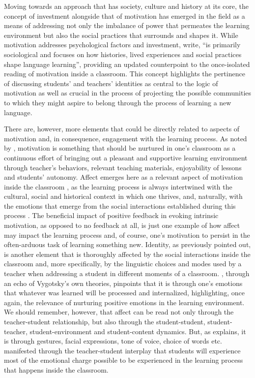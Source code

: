 \documentclass[english]{textolivre}
\begin{document}
Moving towards an approach that has society, culture and history at its core, the concept of investment \cite{norton2011identity} alongside that of motivation has emerged in the field as a means of addressing not only the imbalance of power that permeates the learning environment but also the social practices that surrounds and shapes it. While motivation addresses psychological factors and investment, \textcite[p. 1]{darvin2023investment} write, “is primarily sociological and focuses on how histories, lived experiences and social practices shape language learning”, providing an updated counterpoint to the once-isolated reading of motivation inside a classroom. This concept highlights the pertinence of discussing students’ and teachers’ identities as central to the logic of motivation as well as crucial in the process of projecting the possible communities to which they might aspire to belong \cite{hall2019essentials} through the process of learning a new language.

There are, however, more elements that could be directly related to aspects of motivation and, in consequence, engagement with the learning process. As noted by \textcite{celce2014teaching}, motivation is something that should be nurtured in one’s classroom as a continuous effort of bringing out a pleasant and supportive learning environment through teacher’s behaviors, relevant teaching materials, enjoyability of lessons and students’ autonomy. Affect emerges here as a relevant aspect of motivation inside the classroom \cite{harmer2007practice}, as the learning process is always intertwined with the cultural, social and historical context in which one thrives, and, naturally, with the emotions that emerge from the social interactions established during this process \cite{vygotsky1978mind}. The beneficial impact of positive feedback \cite{ryan2009promoting, guthie2012} in evoking intrinsic motivation, as opposed to no feedback at all, is just one example of how affect may impact the learning process and, of course, one’s motivation to persist in the often-arduous task of learning something new. Identity, as previously pointed out, is another element that is thoroughly affected by the social interactions inside the classroom and, more specifically, by the linguistic choices and modes used by a teacher when addressing a student \cite[p. 116]{hall2019essentials} in different moments of a classroom. \textcite{cunha2017afeto}, through an echo of Vygotsky’s own theories, pinpoints that it is through one's emotions that whatever was learned will be processed and internalized, highlighting, once again, the relevance of nurturing positive emotions in the learning environment. We should remember, however, that affect can be read not only through the teacher-student relationship, but also through the student-student, student-teacher, student-environment and student-content dynamics. But, as \textcite[p. 264]{leite2012afetividade} explains, it is through gestures, facial expressions, tone of voice, choice of words etc. manifested through the teacher-student interplay that students will experience most of the emotional charge possible to be experienced in the learning process that happens inside the classroom.
\end{document}

